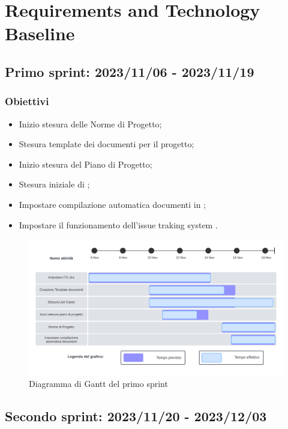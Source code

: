 \section{Requirements and Technology Baseline}
\label{pianificazione:rtb}

\subsection{Primo sprint: 2023/11/06 - 2023/11/19}
\subsubsection{Obiettivi}
\begin{itemize} 
    \item Inizio stesura delle Norme di Progetto;
    \item Stesura template dei documenti per il progetto;
    \item Inizio stesura del Piano di Progetto;
    \item Stesura iniziale di ;
    \item Impostare compilazione automatica documenti in \ccgloss{\LaTeX};
    \item Impostare il funzionamento dell'issue traking system .
\end{itemize}

\begin{figure}[h!]
    \centering  
    \includegraphics[width=\textwidth]{Roadmap1sprint.png}
    \caption{Diagramma di Gantt del primo sprint}
    \label{fig:roadmap1s}
\end{figure}
\newpage

\subsection{Secondo sprint: 2023/11/20 - 2023/12/03}

